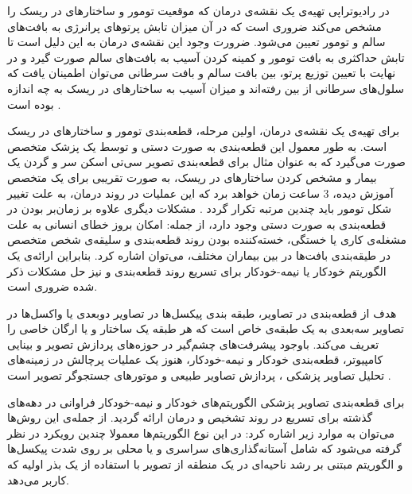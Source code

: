 در رادیوتراپی تهیه‌ی یک نقشه‌ی درمان که موقعیت تومور و ساختارهای در ریسک را مشخص می‌کند ضروری است که در آن میزان تابش پرتوهای پرانرژی به بافت‌های سالم و تومور تعیین می‌شود. ضرورت وجود این نقشه‌ی درمان به این دلیل است تا تابش حداکثری به بافت تومور و کمینه کردن آسیب به بافت‌های سالم صورت گیرد و در نهایت با تعیین توزیع پرتو، بین بافت سالم و بافت سرطانی می‌توان اطمینان یافت که سلول‌های سرطانی از بین رفته‌اند و میزان آسیب به ساختارهای در ریسک به چه اندازه بوده است .

برای تهیه‌ی یک نقشه‌ی درمان، اولین مرحله، قطعه‌بندی تومور و ساختار‌های در ریسک است. به طور معمول این قطعه‌بندی به صورت دستی و توسط یک پزشک متخصص صورت می‌گیرد که به عنوان مثال برای قطعه‌بندی تصویر سی‌تی اسکن سر و گردن یک بیمار و مشخص کردن ساختارهای در ریسک، به صورت تقریبی برای یک متخصص آموزش دیده، 3 ساعت زمان خواهد برد  که این عملیات در روند درمان، به علت تغییر شکل تومور باید چندین مرتبه تکرار گردد . مشکلات دیگری علاوه بر زمان‌بر بودن در قطعه‌بندی به صورت دستی وجود دارد، از جمله: امکان بروز خطای انسانی به علت مشغله‌ی کاری یا خستگی، خسته‌کننده بودن روند قطعه‌بندی و سلیقه‌ی شخص متخصص در طیقه‌بندی بافت‌ها در بین بیماران مختلف، می‌توان اشاره کرد. بنابراین ارائه‌ی یک الگوریتم خودکار یا نیمه-خودکار برای تسریع روند قطعه‌بندی و نیز حل مشکلات ذکر شده ضروری است. 


هدف از قطعه‌بندی در تصاویر، طبقه بندی پیکسل‌ها  در تصاویر دوبعدی  یا واکسل‌ها  در تصاویر سه‌بعدی  به یک طبقه‌ی خاص است که هر طبقه یک ساختار و یا ارگان خاصی را تعریف می‌کند. باوجود پیشرفت‌های چشم‌گیر در حوزه‌های پردازش تصویر   و بینایی کامپیوتر، قطعه‌بندی خودکار و نیمه-خودکار، هنوز یک عملیات پرچالش در زمینه‌های تحلیل تصاویر پزشکی  ، پردازش تصاویر طبیعی  و موتورهای جستجوگر تصویر است . 

برای قطعه‌بندی تصاویر پزشکی الگوریتم‌های خودکار و نیمه-خودکار فراوانی در دهه‌های گذشته برای تسریع در روند تشخیص و درمان ارائه گردید. از جمله‌ی این روش‌ها می‌توان به موارد زیر اشاره کرد:
   در این نوع الگوریتم‌ها معمولا چندین رویکرد در نظر گرفته می‌شود که شامل آستانه‌گذاری‌های سراسری و یا محلی  بر روی شدت پیکسل‌ها و الگوریتم مبتنی بر رشد ناحیه‌ای  در یک منطقه از تصویر با استفاده از یک بذر  اولیه که کاربر می‌دهد.
 

